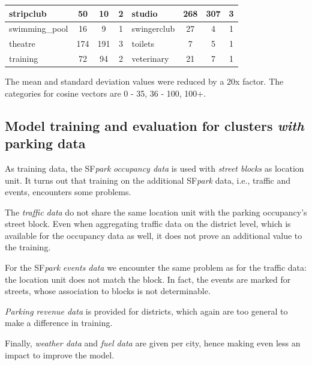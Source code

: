 \begin{table}[!ht]
{\begin{tabular}{ | l | c | c | c || l | c | c | c |}
			stripclub & 50 & 10 & 2 & studio & 268 & 307 & 3 \\ \hline
			swimming\_pool & 16 & 9 & 1 & swingerclub & 27 & 4 & 1 \\ \hline
			theatre & 174 & 191 & 3 & toilets & 7 & 5 & 1 \\ \hline
			training & 72 & 94 & 2 & veterinary & 21 & 7 & 1 \\ \hline
	\end{tabular}}
	\label{tab:amenity_area_values}
	\begin{tabnote}
		The mean and standard deviation values were reduced by a 20x factor. The categories for cosine vectors are 0 - 35, 36 - 100, 100+.
	\end{tabnote}
\end{table}

\subsection{Model training and evaluation for clusters \emph{with} parking data}
\label{experimental_setup:model_training}
As training data, the SF\textit{park} \textit{occupancy data} is used with \textit{street blocks} as location unit. It turns out that training on the additional SF\textit{park} data, i.e., traffic and events, encounters some problems. 

The \textit{traffic data} do not share the same location unit with the parking occupancy's street block. Even when aggregating traffic data on the district level, which is available for the occupancy data as well, it does not prove an additional value to the training. 

For the SF\textit{park} \textit{events data} we encounter the same problem as for the traffic data: the location unit does not match the block. In fact, the events are marked for streets, whose association to blocks is not determinable. 

\textit{Parking revenue data} is provided for districts, which again are too general to make a difference in training.

Finally, \textit{weather data} and \textit{fuel data} are given per city, hence making even less an impact to improve the model.  

